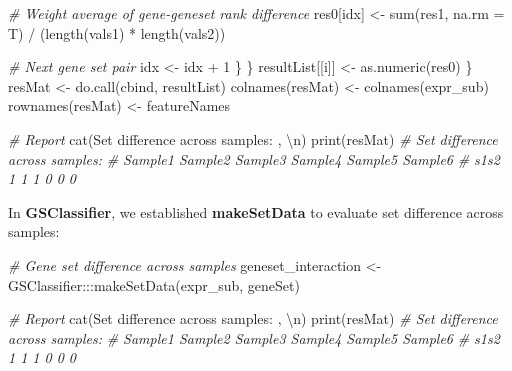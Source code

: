 \documentclass[
  12pt,
]{book}
\newenvironment{Shaded}{\begin{snugshade}}{\end{snugshade}}
\newcommand{\AttributeTok}[1]{\textcolor[rgb]{0.77,0.63,0.00}{#1}}
\newcommand{\CommentTok}[1]{\textcolor[rgb]{0.56,0.35,0.01}{\textit{#1}}}
\newcommand{\DecValTok}[1]{\textcolor[rgb]{0.00,0.00,0.81}{#1}}
\newcommand{\FunctionTok}[1]{\textcolor[rgb]{0.00,0.00,0.00}{#1}}
\newcommand{\NormalTok}[1]{#1}
\newcommand{\OtherTok}[1]{\textcolor[rgb]{0.56,0.35,0.01}{#1}}
\newcommand{\SpecialCharTok}[1]{\textcolor[rgb]{0.00,0.00,0.00}{#1}}
\newcommand{\StringTok}[1]{\textcolor[rgb]{0.31,0.60,0.02}{#1}}
\begin{document}
\begin{Shaded}
\begin{Highlighting}[]
      \CommentTok{\# Weight average of gene{-}geneset rank difference}
\NormalTok{      res0[idx] }\OtherTok{\textless{}{-}} \FunctionTok{sum}\NormalTok{(res1, }\AttributeTok{na.rm =}\NormalTok{ T) }\SpecialCharTok{/}\NormalTok{ (}\FunctionTok{length}\NormalTok{(vals1) }\SpecialCharTok{*} \FunctionTok{length}\NormalTok{(vals2))}
      
      \CommentTok{\# Next gene set pair}
\NormalTok{      idx }\OtherTok{\textless{}{-}}\NormalTok{ idx }\SpecialCharTok{+} \DecValTok{1}
\NormalTok{    \}}
\NormalTok{  \}}
\NormalTok{  resultList[[i]] }\OtherTok{\textless{}{-}} \FunctionTok{as.numeric}\NormalTok{(res0)}
\NormalTok{\}}
\NormalTok{resMat }\OtherTok{\textless{}{-}} \FunctionTok{do.call}\NormalTok{(cbind, resultList)}
\FunctionTok{colnames}\NormalTok{(resMat) }\OtherTok{\textless{}{-}} \FunctionTok{colnames}\NormalTok{(expr\_sub)}
\FunctionTok{rownames}\NormalTok{(resMat) }\OtherTok{\textless{}{-}}\NormalTok{ featureNames}

\CommentTok{\# Report }
\FunctionTok{cat}\NormalTok{(}\StringTok{\textquotesingle{}Set difference across samples: \textquotesingle{}}\NormalTok{, }\StringTok{\textquotesingle{}}\SpecialCharTok{\textbackslash{}n}\StringTok{\textquotesingle{}}\NormalTok{)}
\FunctionTok{print}\NormalTok{(resMat)}
\CommentTok{\# Set difference across samples:  }
\CommentTok{\#      Sample1 Sample2 Sample3 Sample4 Sample5 Sample6}
\CommentTok{\# s1s2       1       1       1       0       0       0}
\end{Highlighting}
\end{Shaded}

In \textbf{GSClassifier}, we established \textbf{makeSetData} to evaluate set difference across samples:

\begin{Shaded}
\begin{Highlighting}[]

\CommentTok{\# Gene set difference across samples}
\NormalTok{geneset\_interaction }\OtherTok{\textless{}{-}}\NormalTok{ GSClassifier}\SpecialCharTok{:::}\FunctionTok{makeSetData}\NormalTok{(expr\_sub, geneSet)}

\CommentTok{\# Report }
\FunctionTok{cat}\NormalTok{(}\StringTok{\textquotesingle{}Set difference across samples: \textquotesingle{}}\NormalTok{, }\StringTok{\textquotesingle{}}\SpecialCharTok{\textbackslash{}n}\StringTok{\textquotesingle{}}\NormalTok{)}
\FunctionTok{print}\NormalTok{(resMat)}
\CommentTok{\# Set difference across samples:  }
\CommentTok{\#      Sample1 Sample2 Sample3 Sample4 Sample5 Sample6}
\CommentTok{\# s1s2       1       1       1       0       0       0}
\end{Highlighting}
\end{Shaded}
\end{document}
